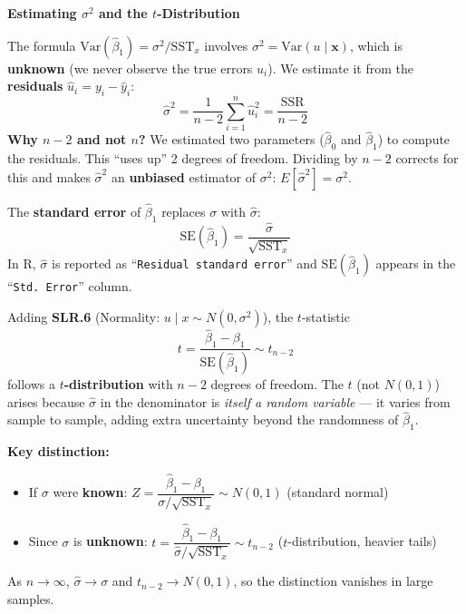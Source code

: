 \documentclass[11pt,a4paper]{article}
\begin{document}
\begin{bookexample}
\textbf{\color{blockcolor}Estimating $\sigma^2$ and the $t$-Distribution}

\smallskip
The formula $\text{Var}(\hat{\beta}_1) = \sigma^2/\text{SST}_x$ involves $\sigma^2 = \text{Var}(u \mid \mathbf{x})$, which is \textbf{unknown} (we never observe the true errors $u_i$). We estimate it from the \textbf{residuals} $\hat{u}_i = y_i - \hat{y}_i$:
\[
  \hat{\sigma}^2 = \frac{1}{n-2}\sum_{i=1}^{n} \hat{u}_i^2
  = \frac{\text{SSR}}{n-2}
\]
\textbf{Why $n-2$ and not $n$?} We estimated two parameters ($\hat{\beta}_0$ and $\hat{\beta}_1$) to compute the residuals. This ``uses up'' 2 degrees of freedom. Dividing by $n-2$ corrects for this and makes $\hat{\sigma}^2$ an \textbf{unbiased} estimator of $\sigma^2$: $E[\hat{\sigma}^2] = \sigma^2$.

\smallskip
The \textbf{standard error} of $\hat{\beta}_1$ replaces $\sigma$ with $\hat{\sigma}$:
\[
  \text{SE}(\hat{\beta}_1) = \frac{\hat{\sigma}}{\sqrt{\text{SST}_x}}
\]
In R, $\hat{\sigma}$ is reported as ``\texttt{Residual standard error}'' and $\text{SE}(\hat{\beta}_1)$ appears in the ``\texttt{Std.\ Error}'' column.

\smallskip
Adding \textbf{SLR.6} (Normality: $u \mid x \sim N(0, \sigma^2)$), the $t$-statistic
\[
  t = \frac{\hat{\beta}_1 - \beta_1}{\text{SE}(\hat{\beta}_1)} \sim t_{n-2}
\]
follows a \textbf{$t$-distribution} with $n - 2$ degrees of freedom. The $t$ (not $N(0,1)$) arises because $\hat{\sigma}$ in the denominator is \emph{itself a random variable} --- it varies from sample to sample, adding extra uncertainty beyond the randomness of $\hat{\beta}_1$.

\smallskip
\textbf{Key distinction:}
\begin{itemize}[leftmargin=1.5em, itemsep=2pt]
  \item If $\sigma$ were \textbf{known}: $Z = \dfrac{\hat{\beta}_1 - \beta_1}{\sigma/\sqrt{\text{SST}_x}} \sim N(0,1)$ \quad (standard normal)
  \item Since $\sigma$ is \textbf{unknown}: $t = \dfrac{\hat{\beta}_1 - \beta_1}{\hat{\sigma}/\sqrt{\text{SST}_x}} \sim t_{n-2}$ \quad ($t$-distribution, heavier tails)
\end{itemize}
As $n \to \infty$, $\hat{\sigma} \to \sigma$ and $t_{n-2} \to N(0,1)$, so the distinction vanishes in large samples.
\end{bookexample}

\bigskip
\end{document}
